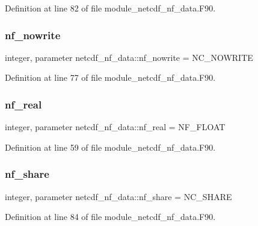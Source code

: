 Definition at line 82 of file module\+\_\+netcdf\+\_\+nf\+\_\+data.\+F90.

\mbox{\label{namespacenetcdf__nf__data_a9ce94f6db387c6d8dbb4b42b50c99b41}} 
\subsubsection{\texorpdfstring{nf\+\_\+nowrite}{nf\_nowrite}}
{\footnotesize\ttfamily integer, parameter netcdf\+\_\+nf\+\_\+data\+::nf\+\_\+nowrite = N\+C\+\_\+\+N\+O\+W\+R\+I\+TE}



Definition at line 77 of file module\+\_\+netcdf\+\_\+nf\+\_\+data.\+F90.

\mbox{\label{namespacenetcdf__nf__data_a1d9182cde0ed15fe455e016e1c7f4ff4}} 
\subsubsection{\texorpdfstring{nf\+\_\+real}{nf\_real}}
{\footnotesize\ttfamily integer, parameter netcdf\+\_\+nf\+\_\+data\+::nf\+\_\+real = N\+F\+\_\+\+F\+L\+O\+AT}



Definition at line 59 of file module\+\_\+netcdf\+\_\+nf\+\_\+data.\+F90.

\mbox{\label{namespacenetcdf__nf__data_a2670fde546ed052a821c507ed5beef88}} 
\subsubsection{\texorpdfstring{nf\+\_\+share}{nf\_share}}
{\footnotesize\ttfamily integer, parameter netcdf\+\_\+nf\+\_\+data\+::nf\+\_\+share = N\+C\+\_\+\+S\+H\+A\+RE}



Definition at line 84 of file module\+\_\+netcdf\+\_\+nf\+\_\+data.\+F90.

